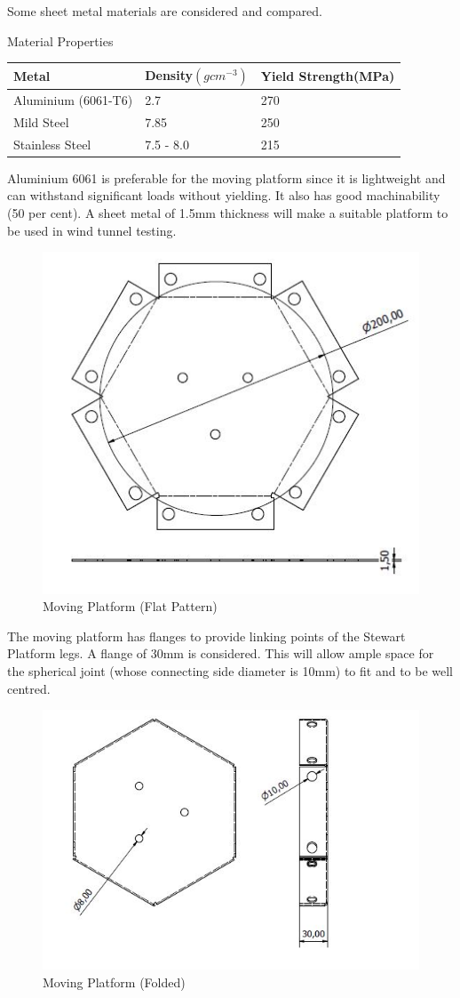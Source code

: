 Some sheet metal materials are considered and compared.
\begin{table}[!h]
	\caption[Sheet Metal Properties]{Material Properties}
\end{table}
\begin{center}
\centering
\begin{tabular}{|l|l|l|}
\hline
\textbf{Metal} & \textbf{Density$(gcm^{-3})$} & \textbf{Yield Strength(MPa)}\\
\hline
Aluminium (6061-T6)& 2.7 & 270\\
\hline
Mild Steel & 7.85 & 250\\
\hline
Stainless Steel & 7.5 - 8.0 & 215\\
\hline
\end{tabular}
\end{center}
Aluminium 6061 is preferable for the moving platform since it is lightweight and can withstand significant loads without yielding. It also has good machinability (50 per cent). A sheet metal of 1.5mm thickness will make a suitable platform to be used in wind tunnel testing.
\begin{center}
	\begin{figure}[H]
	\centering
	\includegraphics[width=0.6\linewidth]{Figures/Flat}
	\caption[Moving Platform]{Moving Platform (Flat Pattern)}
	\end{figure}
\end{center}

The moving platform has flanges to provide linking points of the Stewart Platform legs. A flange of 30mm is considered. This will allow ample space for the spherical joint (whose connecting side diameter is 10mm) to fit and to be well centred.
\begin{center}
	\begin{figure}[H]
	\centering
	\includegraphics[width=0.6\linewidth]{Figures/Folded}
	\caption[Moving Platform]{Moving Platform (Folded)}
	\end{figure}
\end{center}

